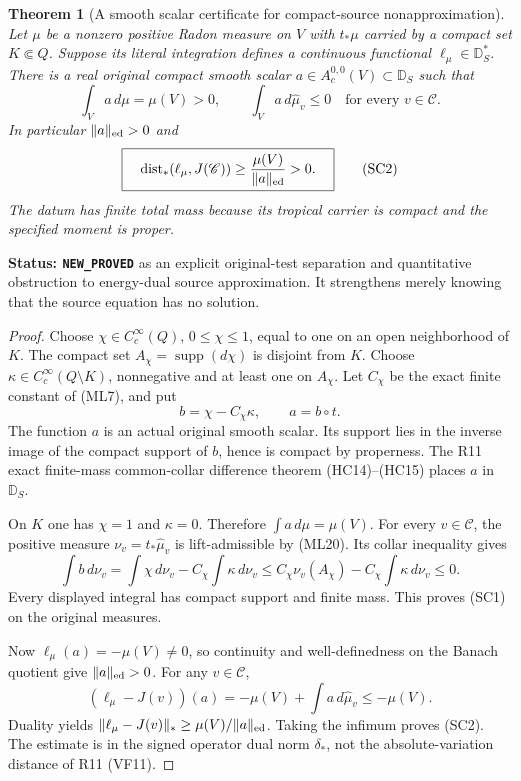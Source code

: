 \documentclass[11pt,a4paper]{article}
\numberwithin{equation}{section}
\newtheorem{theorem}{Theorem}[section]
\theoremstyle{definition}
\theoremstyle{remark}
\begin{document}
\begin{theorem}[A smooth scalar certificate for compact-source nonapproximation]
\label{thm:r12-smooth-source-separator}
Let $\mu$ be a nonzero positive Radon measure on $V$ with
$t_*\mu$ carried by a compact set $K\Subset Q$.  Suppose its
literal integration defines a continuous functional
$\ell_\mu\in\mathbb D_S^*$.
There is a real original compact smooth scalar
$a\in A_c^{0,0}(V)\subset\mathbb D_S$ such that
\[
 \int_Va\,d\mu=\mu(V)>0,
 \qquad
 \int_Va\,d\widehat\mu_v\le0
                         \quad\text{for every }v\in\mathscr C.
 \tag{SC1}
\]
In particular $\|a\|_{\rm ed}>0$ and
\[
 \boxed{\quad
 \operatorname{dist}_*(\ell_\mu,J(\mathscr C))
                       \ge\frac{\mu(V)}{\|a\|_{\rm ed}}>0.
 \quad}
 \tag{SC2}
\]
The datum has finite total mass because its tropical carrier
is compact and the specified moment is proper.
\end{theorem}

\noindent\textbf{Status: \texttt{NEW\_PROVED}} as an
explicit original-test separation and quantitative obstruction
to energy-dual source approximation.  It strengthens merely
knowing that the source equation has no solution.

\begin{proof}
Choose $\chi\in C_c^\infty(Q)$, $0\le\chi\le1$, equal
to one on an open neighborhood of $K$.  The compact set
$A_\chi=\operatorname{supp}(d\chi)$ is disjoint from $K$.
Choose $\kappa\in C_c^\infty(Q\setminus K)$, nonnegative
and at least one on $A_\chi$.  Let $C_\chi$ be the exact
finite constant of \textup{(ML7)}, and put
\[
                    b=\chi-C_\chi\kappa,\qquad a=b\circ t.
 \tag{SC3}
\]
The function $a$ is an actual original smooth scalar.  Its
support lies in the inverse image of the compact support
of $b$, hence is compact by properness.  The R11 exact
finite-mass common-collar difference theorem
\textup{(HC14)--(HC15)} places $a$ in $\mathbb D_S$.

On $K$ one has $\chi=1$ and $\kappa=0$.  Therefore
$\int a\,d\mu=\mu(V)$.  For every $v\in\mathscr C$,
the positive measure $\nu_v=t_*\widehat\mu_v$ is
lift-admissible by \textup{(ML20)}.  Its collar inequality
gives
\[
 \int b\,d\nu_v
    =\int\chi\,d\nu_v-C_\chi\int\kappa\,d\nu_v
    \le C_\chi\nu_v(A_\chi)
                -C_\chi\int\kappa\,d\nu_v\le0.
 \tag{SC4}
\]
Every displayed integral has compact support and finite
mass.  This proves \textup{(SC1)} on the original measures.

Now $\ell_\mu(a)=-\mu(V)\ne0$, so continuity and
well-definedness on the Banach quotient give
$\|a\|_{\rm ed}>0$.  For any $v\in\mathscr C$,
\[
 (\ell_\mu-J(v))(a)
       =-\mu(V)+\int a\,d\widehat\mu_v\le-\mu(V).
\]
Duality yields
$\|\ell_\mu-J(v)\|_*\ge\mu(V)/\|a\|_{\rm ed}$.
Taking the infimum proves \textup{(SC2)}.  The estimate is
in the signed operator dual norm $\delta_*$, not the
absolute-variation distance of R11 \textup{(VF11)}.
\end{proof}
\end{document}
